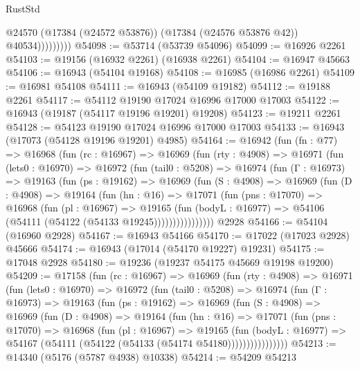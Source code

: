 \begin{lexlean}{RustStd}
\begin{coremodule}
                      @24570
                      (@17384 (@24572 @53876))
                      (@17384 (@24576 @53876 @42))
                      @40534)))))))))
@54098 := @53714 (@53739 @54096)
@54099 := @16926 @2261
@54103 := @19156 (@16932 @2261) (@16938 @2261)
@54104 := @16947 @45663
@54106 := @16943 (@54104 @19168)
@54108 := @16985 (@16986 @2261)
@54109 := @16981 @54108
@54111 := @16943 (@54109 @19182)
@54112 := @19188 @2261
@54117 := @54112 @19190 @17024 @16996 @17000 @17003
@54122 := @16943 (@19187 (@54117 @19196 @19201) @19208)
@54123 := @19211 @2261
@54128 := @54123 @19190 @17024 @16996 @17000 @17003
@54133 := @16943 (@17073 (@54128 @19196 @19201) @4985)
@54164 := @16942
    (fun (fn : @77) =>
    @16968
      (fun (rc : @16967) =>
      @16969
        (fun (rty : @4908) =>
        @16971
          (fun (lets0 : @16970) =>
          @16972
            (fun (tail0 : @5208) =>
            @16974
              (fun (Γ : @16973) =>
              @19163
                (fun (ps : @19162) =>
                @16969
                  (fun (S : @4908) =>
                  @16969
                    (fun (D : @4908) =>
                    @19164
                      (fun (hn : @16) =>
                      @17071
                        (fun (pns : @17070) =>
                        @16968
                          (fun (pl : @16967) =>
                          @19165
                            (fun (bodyL : @16977) =>
                            @54106 (@54111 (@54122 (@54133 @19245))))))))))))))))
    @2928
@54166 := @54104 (@16960 @2928)
@54167 := @16943 @54166
@54170 := @17022 (@17023 @2928) @45666
@54174 := @16943 (@17014 (@54170 @19227) @19231)
@54175 := @17048 @2928
@54180 := @19236 (@19237 @54175 @45669 @19198 @19200)
@54209 := @17158
    (fun (rc : @16967) =>
    @16969
      (fun (rty : @4908) =>
      @16971
        (fun (lets0 : @16970) =>
        @16972
          (fun (tail0 : @5208) =>
          @16974
            (fun (Γ : @16973) =>
            @19163
              (fun (ps : @19162) =>
              @16969
                (fun (S : @4908) =>
                @16969
                  (fun (D : @4908) =>
                  @19164
                    (fun (hn : @16) =>
                    @17071
                      (fun (pns : @17070) =>
                      @16968
                        (fun (pl : @16967) =>
                        @19165
                          (fun (bodyL : @16977) =>
                          @54167 (@54111 (@54122 (@54133 (@54174 @54180))))))))))))))))
@54213 := @14340 (@5176 (@5787 @4938) @10338)
@54214 := @54209 @54213

\end{coremodule}
\end{lexlean}
